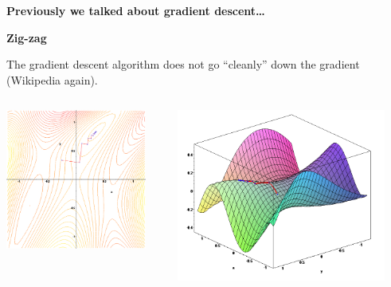 \documentclass{beamer}
\newcommand{\placard}[1]{
  \begin{frame}
    \begin{center}
      \huge
      \textbf{#1}
    \end{center}
  \end{frame}
}
\newcommand{\pagestepalt}[2]{
  \begin{frame}[t]
    \begin{minipage}[t][0.26\textheight][t]{\textwidth}
      \begin{center}
        \huge
        \textbf{#1}
      \end{center}
    \end{minipage}
    
    \begin{minipage}[t][0.7\textheight][c]{\textwidth}
      #2
    \end{minipage}
  \end{frame}
}
\begin{document}
\placard{Previously we talked about gradient descent\ldots}

\pagestepalt{Zig-zag}{
  The gradient descent algorithm does not go
  ``cleanly'' down the gradient (Wikipedia again).
  \vspace{-0.5cm}
  \begin{columns}[T]
    \begin{column}{0.49\textwidth}
      \begin{center}
        \includegraphics[width=0.9\textwidth]{grad1.png}
      \end{center}
    \end{column}
    \begin{column}{0.49\textwidth}
      \begin{center}
        \includegraphics[width=0.9\textwidth]{grad2.png}
      \end{center}
    \end{column}
  \end{columns}
}
\end{document}
